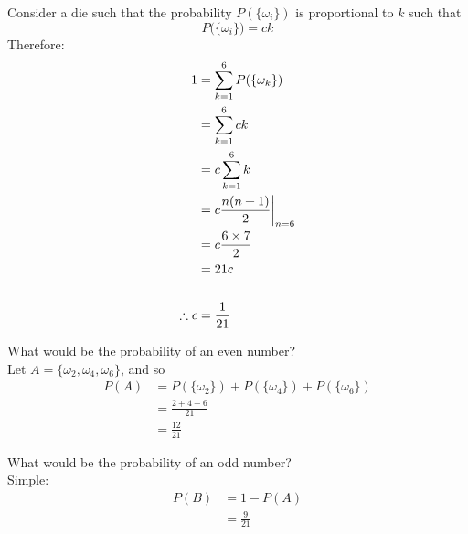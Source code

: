 \documentclass{article}
\begin{document}
	\begin{exe}
		Consider a die such that the probability $P(\{\omega_i\})$ is proportional to $k$ such that
		$$ P \big( \{\omega_i\} \big) = ck$$
		Therefore:
		\begin{align*}
			1 &= \sum_{k=1}^6 P(\{\omega_k\}) \\
			&= \sum_{k=1}^6 ck \\
			&= c\sum_{k=1}^6 k \\
			&= c\frac{n(n+1)}{2}\bigg|_{n=6} \\
			&= c \frac{6 \times 7}{2} \\
			&= 21c\\
		\intertext{ }
			\therefore c &= \frac{1}{21}
		\end{align*}
		
		What would be the probability of an even number?\\
		Let $A = \{ \omega_2, \omega_4, \omega_6 \}$, and so
		\begin{align*}
			P(A) &= P(\{\omega_2\}) + P(\{\omega_4\}) + P(\{\omega_6\})  \\
			&= \frac{2+4+6}{21} \\
			&= \frac{12}{21}
		\end{align*}
		
		What would be the probability of an odd number?\\
		Simple:
		\begin{align*}
			P(B) &= 1- P(A) \\
			&= \frac{9}{21}
		\end{align*}
	\end{exe}
\end{document}
